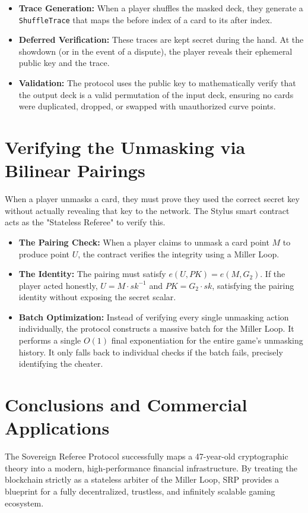 \documentclass[11pt, a4paper]{article}
\begin{document}
\begin{itemize}
    \item \textbf{Trace Generation:} When a player shuffles the masked deck, they generate a \texttt{ShuffleTrace} that maps the before index of a card to its after index.
    \item \textbf{Deferred Verification:} These traces are kept secret during the hand. At the showdown (or in the event of a dispute), the player reveals their ephemeral public key and the trace.
    \item \textbf{Validation:} The protocol uses the public key to mathematically verify that the output deck is a valid permutation of the input deck, ensuring no cards were duplicated, dropped, or swapped with unauthorized curve points.
\end{itemize}

\section{Verifying the Unmasking via Bilinear Pairings}
When a player unmasks a card, they must prove they used the correct secret key without actually revealing that key to the network. The Stylus smart contract acts as the "Stateless Referee" to verify this.

\begin{itemize}
    \item \textbf{The Pairing Check:} When a player claims to unmask a card point $M$ to produce point $U$, the contract verifies the integrity using a Miller Loop.
    \item \textbf{The Identity:} The pairing must satisfy $e(U, PK) = e(M, G_2)$. If the player acted honestly, $U = M \cdot sk^{-1}$ and $PK = G_2 \cdot sk$, satisfying the pairing identity without exposing the secret scalar.
    \item \textbf{Batch Optimization:} Instead of verifying every single unmasking action individually, the protocol constructs a massive batch for the Miller Loop. It performs a single $O(1)$ final exponentiation for the entire game's unmasking history. It only falls back to individual checks if the batch fails, precisely identifying the cheater.
\end{itemize}

\section{Conclusions and Commercial Applications}
The Sovereign Referee Protocol successfully maps a 47-year-old cryptographic theory into a modern, high-performance financial infrastructure. By treating the blockchain strictly as a stateless arbiter of the Miller Loop, SRP provides a blueprint for a fully decentralized, trustless, and infinitely scalable gaming ecosystem.
\end{document}

